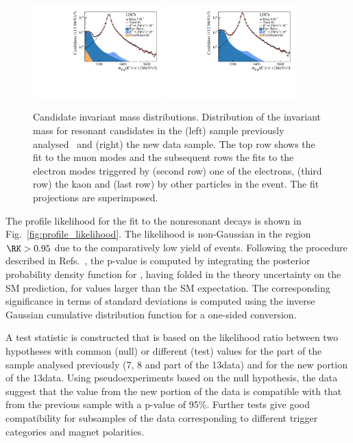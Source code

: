 \begin{figure}
    \includegraphics[width=0.45\textwidth]{figures/Fig7g.pdf}
    \includegraphics[width=0.45\textwidth]{figures/Fig7h.pdf}
    
    \caption{Candidate invariant mass distributions. Distribution of the invariant mass \mKllconst for resonant candidates in the (left) sample previously analysed~\cite{LHCb-PAPER-2019-009} and (right) the new data sample. The top row shows the fit to the muon modes and the subsequent rows the fits to the electron modes triggered by (second row) one of the electrons, (third row) the kaon and (last row) by other particles in the event. The fit projections are superimposed.
}
    \label{fig:resfits_categories}
\end{figure}


The profile likelihood for the fit to the nonresonant decays is shown in Fig.~\ref{fig:profile_likelihood}. The likelihood is non-Gaussian in the region $\RK>0.95$ due to the comparatively low yield of \BuKee events. 
Following the procedure described in Refs.~\cite{LHCb-PAPER-2019-009, LHCb-PAPER-2017-013}, the p-value is computed by integrating the posterior probability density function for \RK, having folded in the theory uncertainty on the SM prediction, for \RK values larger than the SM  expectation. The corresponding significance in terms of standard deviations is computed using the inverse Gaussian cumulative distribution function for a one-sided conversion.

A test statistic is constructed that is based on the likelihood ratio between two hypotheses with common (null) or different (test) \RK values for the part of the sample analysed previously (7, 8 and part of the 13\tev data) and for the new portion of the 13\tev data. Using pseudoexperiments based on the null hypothesis, the data suggest that the \RK value from the new portion of the data is compatible with that from the previous sample with a p-value of 95\%. Further tests give good compatibility for subsamples of the data corresponding to different trigger categories and magnet polarities.

